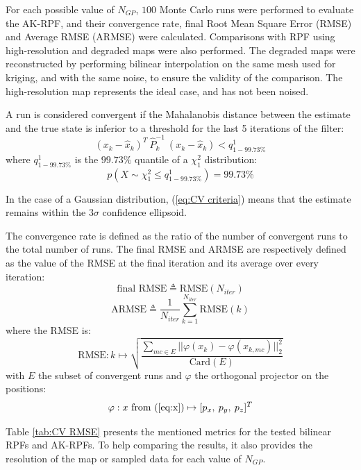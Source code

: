 \documentclass[conference]{IEEEtran}
\begin{document}
For each possible value of $N_{GP}$, $100$ Monte Carlo runs were performed to evaluate the AK-RPF, and their convergence rate, final Root Mean Square Error (RMSE) and Average RMSE (ARMSE) were calculated. Comparisons with RPF using high-resolution and degraded maps were also performed. The degraded maps were reconstructed by performing bilinear interpolation on the same mesh used for kriging, and with the same noise, to ensure the validity of the comparison. The high-resolution map represents the ideal case, and has not been noised.

A run is considered convergent if the Mahalanobis distance between the estimate and the true state is inferior to a threshold for the last 5 iterations of the filter:
\begin{equation}
(x_k-\hat x_k)^T\:\hat P_k^{-1}\:(x_k-\hat x_k) < q^1_{1-99.73\%} \label{eq:CV criteria}
\end{equation}
where $q^1_{1-99.73\%}$ is the $99.73\%$ quantile of a $\chi^2_1$ distribution:
\begin{equation}
p(X\sim\chi^2_1 \leq q^1_{1-99.73\%})=99.73\%
\end{equation}

In the case of a Gaussian distribution, (\ref{eq:CV criteria}) means that the estimate remains within the $3\sigma$ confidence ellipsoid.

The convergence rate is defined as the ratio of the number of convergent runs to the total number of runs. The final RMSE and ARMSE are respectively defined as the value of the RMSE at the final iteration and its average over every iteration:
\begin{equation}
\text{final RMSE} \triangleq \text{RMSE}(N_{iter})
\end{equation}
\begin{equation}
\text{ARMSE} \triangleq \frac{1}{N_{iter}}\sum_{k=1}^{N_{iter}}\text{RMSE}(k)
\end{equation}
where the RMSE is:
\begin{equation}
\text{RMSE} : k \mapsto \sqrt{\frac{\sum_{mc\in E}||\varphi(x_k)-\varphi(\hat x_{k,mc})||_2^2}{\text{Card}(E)}}
\end{equation}
with $E$ the subset of convergent runs and $\varphi$ the orthogonal projector on the positions:
\begin{equation}
\varphi : x\text{ from (}\ref{eq:x}\text{)}\mapsto [p_x, \: p_y, \: p_z]^T
\end{equation}

Table \ref{tab:CV RMSE} presents the mentioned metrics for the tested bilinear RPFs and AK-RPFs. To help comparing the results, it also provides the resolution of the map or sampled data for each value of $N_{GP}$.
\end{document}
